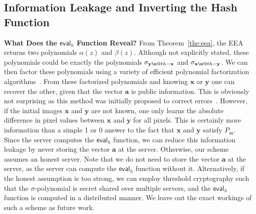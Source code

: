 \documentclass[pdflatex,sn-mathphys-num]{sn-jnl}
\makeatletter
\newcommand{\dotdiv}{\mathbin{\text{\@dotdiv}}}
\newcommand{\@dotdiv}{%
  \ooalign{\hidewidth\raise1ex\hbox{.}\hidewidth\cr$\m@th-$\cr}%
}
\newcommand{\descr}[1]{\vspace{0.2cm} \noindent \textbf{#1}}
\theoremstyle{definition}
\newcommand{\vtr}[1]{\mathbf{#1}}
\makeatother
\begin{document}
\subsection{Information Leakage and Inverting the Hash Function}
\label{subsec:sigma-polynomials-reveal}

\descr{What Does the $\mathsf{eval}_h$ Function Reveal?} From Theorem~\ref{the:eea}, the EEA returns two polynomials $\alpha(z)$ and $\beta(z)$. Although not explicitly stated, these polynomials could be exactly the polynomials $\sigma_{\vtr{y} \dotdiv \vtr{x}}$ and $\sigma_{\vtr{x} \dotdiv \vtr{y}}$. We can then factor these polynomials using a variety of efficient polynomial factorization algorithms~\cite{shoup-nt-book}. From these factorized polynomials and knowing $\vtr{x}$ or $\vtr{y}$ one can recover the other, given that the vector $\vtr{a}$ is public information. This is obviously not surprising as this method was initially proposed to correct errors~\cite{tallinil1codes}. However, if the initial images $\vtr{x}$ and $\vtr{y}$ are not known, one only learns the absolute difference in pixel values between $\vtr{x}$ and $\vtr{y}$ for all pixels. This is certainly more information than a simple 1 or 0 answer to the fact that $\vtr{x}$ and $\vtr{y}$ satisfy $P_\mathsf{as}$. Since the server computes the $\mathsf{eval}_h$ function, we can reduce this information leakage by never storing the vector $\vtr{a}$ at the server. Otherwise, our scheme assumes an honest server. Note that we do not need to store the vector $\vtr{a}$ at the server, as the server can compute the $\mathsf{eval}_h$ function without it. Alternatively, if the honest assumption is too strong, we can employ threshold cryptography such that the $\sigma$-polynomial is secret shared over multiple servers, and the $\mathsf{eval}_h$ function is computed in a distributed manner. We leave out the exact workings of such a scheme as future work.
\end{document}
